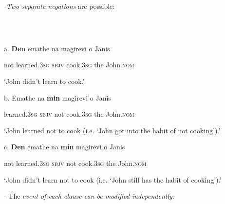 \documentclass[output=paper]{langsci/langscibook}
\begin{document}
\begin{styleNurTexti}
{}-\textit{Two separate negations} are possible:
\end{styleNurTexti}

\begin{styleNurTexti}
\ea%
    \label{ex:key:7}
    \gll\\
        \\
    \glt
    \z

          a.  \textbf{Den}  emathe    na    magirevi   o    Janis
\end{styleNurTexti}

\begin{styleNurTexti}
    not   learned.\textsc{3sg  sbjv}  cook.\textsc{3sg}    the    John.\textsc{nom}
\end{styleNurTexti}

\begin{styleNurTexti}
    ‘John didn’t learn to cook.’
\end{styleNurTexti}

\begin{styleNurTexti}
  b.  Emathe     na   \textbf{min}   magirevi    o    Janis
\end{styleNurTexti}

\begin{styleNurTexti}
    learned.\textsc{3sg}  \textsc{sbjv} not  cook.\textsc{3sg} the   John.\textsc{nom}
\end{styleNurTexti}

\begin{styleNurTexti}
    ‘John learned not to cook (i.e. ‘John got into the habit of not cooking’).’
\end{styleNurTexti}

\begin{styleNurTexti}
  c.  \textbf{Den}   emathe    na   \textbf{min} magirevi    o    Janis
\end{styleNurTexti}

\begin{styleNurTexti}
    not  learned.\textsc{3sg}  \textsc{sbjv} not  cook.\textsc{3sg}    the   John.\textsc{nom}
\end{styleNurTexti}

\begin{styleNurTexti}
    ‘John didn’t learn not to cook (i.e. ‘John still has the habit of cooking’).’
\end{styleNurTexti}

\begin{styleNurTexti}
{}- The \textit{event of each clause can be modified independently}:
\end{styleNurTexti}
\end{document}
